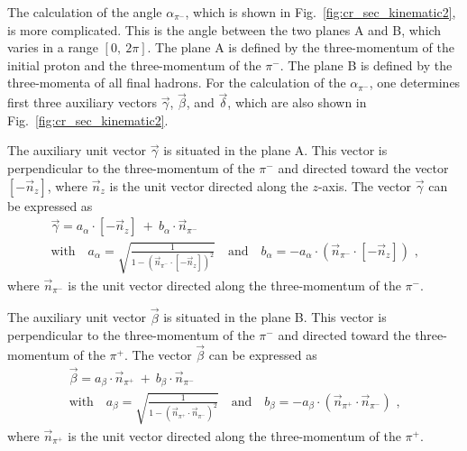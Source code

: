 The calculation of the angle $\alpha_{\pi^{-}}$, which is shown in Fig.~\ref{fig:cr_sec_kinematic2}, is more complicated. This is the angle between the two planes A and B, which varies in a range $[0,~2\pi]$. The plane A is defined by the three-momentum of the initial proton and the three-momentum of the $\pi^{-}$. The plane B is defined by the three-momenta of all final hadrons. For the calculation of the $\alpha_{\pi^{-}}$, one determines first three auxiliary vectors $\vec \gamma$, $\vec \beta$, and $\vec \delta$, which are also shown in Fig.~\ref{fig:cr_sec_kinematic2}.


The auxiliary unit vector $\vec \gamma$ is situated in the plane A. This vector is perpendicular to the three-momentum of the $\pi^{-}$ and directed toward the vector $[-\vec n_{z}]$, where $\vec n_{z}$ is the unit vector directed along the $z$-axis. The vector $\vec \gamma$ can be expressed as
\begin{gather*}
\vec \gamma = a_{\alpha}\cdot[-\vec n_{z}]~+~b_{\alpha}\cdot\vec n_{\pi^{-}}  \nonumber \\[10pt]
\text{with~~~}a_{\alpha}  =\sqrt{\frac{1}{1 - (\vec n_{\pi^{-}} \cdot [-\vec n_{z}] )^{2}}}  \text{~~~and~~~} \label{alphavec}
b_{\alpha}  = -  a_{\alpha}\cdot \left (\vec n_{\pi^{-}} \cdot [-\vec n_{z}] \right) \textrm{ ,} \nonumber
\end{gather*}
where $\vec n_{\pi^{-}}$ is the unit vector directed along the three-momentum of the $\pi^{-}$. 



The auxiliary unit vector $\vec \beta$ is situated in the plane B. This vector is perpendicular to the three-momentum of the $\pi^{-}$ and directed toward the three-momentum of the $\pi^{+}$. The vector $\vec \beta$ can be expressed as
\begin{gather*}
\vec \beta = a_{\beta}\cdot\vec n_{\pi^{+}}~+~b_{\beta}\cdot\vec n_{\pi^{-}}  \nonumber \\[10pt]  
\text{with~~~}a_{\beta} = \sqrt{\frac{1}{1 - (\vec n_{\pi^{+}} \cdot \vec n_{\pi^{-}})^{2}}} \text{~~~and~~~} \label{betavec}
b_{\beta} = -  a_{\beta}\cdot(\vec n_{\pi^{+}} \cdot \vec n_{\pi^{-}}) \textrm{ ,} \nonumber
\end{gather*} 
where $\vec n_{\pi^{+}}$ is the unit vector directed along the three-momentum of the $\pi^{+}$. 


